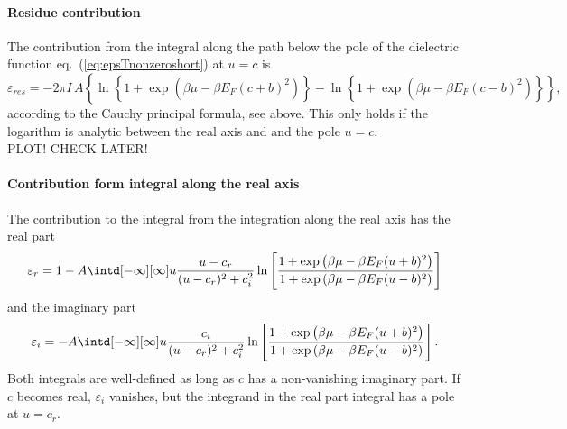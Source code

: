 \documentclass[physics,phd,nolot,nolof]{uccthesis}%
\begin{document}
{\paragraph*{Residue contribution}
The contribution from the integral along the path below the pole of the dielectric function 
eq.~(\ref{eq:epsTnonzeroshort}) at $u=c$ is
  \begin{equation}
    \varepsilon_{res}=-2\pi I \,A 
  \left\lbrace
   \ln \left\{  1+\exp\left(\beta\mu- \beta E_F(c+b)^2 \right) \right\}
   -\ln \left\{ 1+\exp\left(\beta\mu- \beta E_F(c-b)^2 \right) \right\} 
  \right\rbrace,
    \label{eq:epsTnonzero_res}
  \end{equation}
  according to the Cauchy principal formula, see above.
  This only holds if the logarithm is analytic between the real axis and and the pole $u=c$.\\
  PLOT!
  CHECK LATER!
\paragraph*{Contribution form integral along the real axis}
The contribution to the integral from the integration along the real axis has the real part
\begin{equation}
   \varepsilon_r = 1-A 
  \intd[-\infty][\infty]u
  \frac{u-c_r}{(u-c_r)^2+c_i^2} 
   \ln
   \left[
   \frac{  1+\exp\left(\beta\mu- \beta E_F(u+b)^2 \right) }
   { 1+\exp\left(\beta\mu- \beta E_F(u-b)^2 \right) } 
   \right]
  \label{eq:epsTnonzero_r}
\end{equation}
and the imaginary part
\begin{equation}
   \varepsilon_i = -A 
  \intd[-\infty][\infty]u
  \frac{c_i}{(u-c_r)^2+c_i^2} 
   \ln
   \left[
   \frac{  1+\exp\left(\beta\mu- \beta E_F(u+b)^2 \right) }
   { 1+\exp\left(\beta\mu- \beta E_F(u-b)^2 \right) } 
   \right].
  \label{eq:epsTnonzero_i}
\end{equation}
Both integrals are well-defined as long as $c$ has a non-vanishing imaginary part. 
If $c$ becomes real, $\varepsilon_i$ vanishes,
but the integrand in the real part integral has a pole at $u=c_r$.
}
\end{document}
